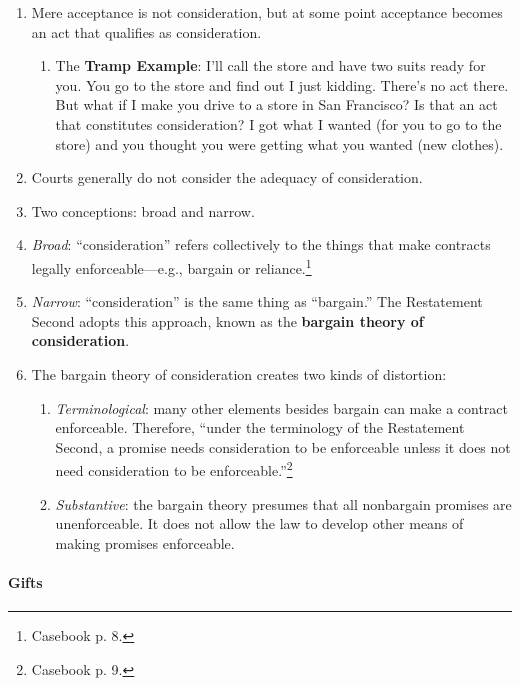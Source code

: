 \begin{enumerate}
    \item Mere acceptance is not consideration, but at some point acceptance 
    becomes an act that qualifies as consideration.
    \begin{enumerate}
        \item The \textbf{Tramp Example}: I'll call the store and have two 
        suits ready for you. You go to the store and find out I just kidding. 
        There's no act there. But what if I make you drive to a store in San 
        Francisco? Is that an act that constitutes consideration? I got what I 
        wanted (for you to go to the store) and you thought you were getting 
        what you wanted (new clothes).
    \end{enumerate}
    \item Courts generally do not consider the adequacy of consideration.
    \item Two conceptions: broad and narrow.
    \item \emph{Broad}: ``consideration'' refers collectively to the things 
    that make contracts legally enforceable---e.g., bargain or 
    reliance.\footnote{Casebook p. 8.}
    \item \emph{Narrow}: ``consideration'' is the same thing as ``bargain.'' 
    The Restatement Second adopts this approach, known as the \textbf{bargain 
    theory of consideration}.
    \item The bargain theory of consideration creates two kinds of distortion:
    \begin{enumerate}
        \item \emph{Terminological}: many other elements besides bargain can 
        make a contract enforceable. Therefore, ``under the terminology of the 
        Restatement Second, a promise needs consideration to be enforceable 
        unless it does not need consideration to be 
        enforceable.''\footnote{Casebook p. 9.}
        \item \emph{Substantive}: the bargain theory presumes that all 
        nonbargain promises are unenforceable. It does not allow the law to 
        develop other means of making promises enforceable.
    \end{enumerate}
\end{enumerate}

\paragraph{Gifts}


